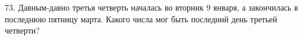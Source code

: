 73. Давным-давно третья четверть началась во вторник 9 января, а закончилась в последнюю пятницу марта. Какого числа мог быть последний день третьей четверти?\\
